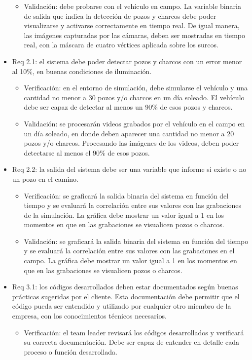 \documentclass[
11pt, %
codirector, %
]{charter}
\begin{document}
\begin{itemize}
\begin{itemize}
		\item Validación: debe probarse con el vehículo en campo. La variable binaria de salida que indica la detección de pozos y charcos debe poder visualizarse y activarse correctamente en tiempo real. De igual manera, las imágenes capturadas por las cámaras, deben ser mostradas en tiempo real, con la máscara de cuatro vértices aplicada sobre los surcos.
	\end{itemize}
	\item Req 2.1: el sistema debe poder detectar pozos y charcos con un error menor al 10\%, en buenas condiciones de iluminación.
	\begin{itemize}
		\item Verificación: en el entorno de simulación, debe simularse el vehículo y una cantidad no menor a 30 pozos y/o charcos en un día soleado. El vehículo debe ser capaz de detectar al menos un 90\% de esos pozos y charcos.
		\item Validación: se procesarán videos grabados por el vehículo en el campo en un día soleado, en donde deben aparecer una cantidad no menor a 20 pozos y/o charcos. Procesando las imágenes de los videos, deben poder detectarse al menos el 90\% de esos pozos.
	\end{itemize}
	\item Req 2.2: la salida del sistema debe ser una variable que informe si existe o no un pozo en el camino.
	\begin{itemize}
		\item Verificación: se graficará la salida binaria del sistema en función del tiempo y se evaluará la correlación entre sus valores con las grabaciones de la simulación. La gráfica debe mostrar un valor igual a 1 en los momentos en que en las grabaciones se visualicen pozos o charcos.
		\item Validación: se graficará la salida binaria del sistema en función del tiempo y se evaluará la correlación entre sus valores con las grabaciones en el campo. La gráfica debe mostrar un valor igual a 1 en los momentos en que en las grabaciones se visualicen pozos o charcos.
	\end{itemize}
	\item Req 3.1: los códigos desarrollados deben estar documentados según buenas prácticas sugeridas por el cliente. Esta documentación debe permitir que el código pueda ser entendido y utilizado por cualquier otro miembro de la empresa, con los conocimientos técnicos necesarios.
	\begin{itemize}
		\item Verificación: el team leader revisará los códigos desarrollados y verificará su correcta documentación. Debe ser capaz de entender en detalle cada proceso o función desarrollada.

\end{itemize}
\end{itemize}
\end{document}
